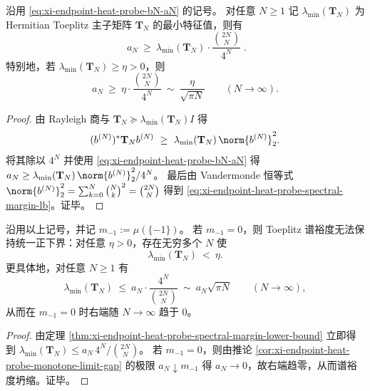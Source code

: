 \begin{theorem}[谱裕度对端点热核的显式下界]\label{thm:xi-endpoint-heat-probe-spectral-margin-lower-bound}
沿用 \eqref{eq:xi-endpoint-heat-probe-bN-aN} 的记号。
对任意 \(N\ge 1\) 记 \(\lambda_{\min}(\mathbf{T}_N)\) 为 Hermitian Toeplitz 主子矩阵 \(\mathbf{T}_N\) 的最小特征值，则有
\begin{equation}\label{eq:xi-endpoint-heat-probe-spectral-margin-lb}
\boxed{\;
a_N\ \ge\ \lambda_{\min}(\mathbf{T}_N)\cdot \frac{\binom{2N}{N}}{4^N}\; }.
\end{equation}
特别地，若 \(\lambda_{\min}(\mathbf{T}_N)\ge \eta>0\)，则
\[
a_N\ \ge\ \eta\cdot \frac{\binom{2N}{N}}{4^N}
\ \sim\ \frac{\eta}{\sqrt{\pi N}}\qquad(N\to\infty).
\]
\end{theorem}
\begin{proof}
由 Rayleigh 商与 \(\mathbf{T}_N\succeq \lambda_{\min}(\mathbf{T}_N)I\) 得
\[
(b^{(N)})^\ast\mathbf{T}_N b^{(N)}\ \ge\ \lambda_{\min}(\mathbf{T}_N)\,\norm{b^{(N)}}_2^2.
\]
将其除以 \(4^N\) 并使用 \eqref{eq:xi-endpoint-heat-probe-bN-aN} 得
\(
a_N\ge \lambda_{\min}(\mathbf{T}_N)\,\norm{b^{(N)}}_2^2/4^N
\)。
最后由 Vandermonde 恒等式
\(
\norm{b^{(N)}}_2^2=\sum_{k=0}^N\binom{N}{k}^2=\binom{2N}{N}
\)
得到 \eqref{eq:xi-endpoint-heat-probe-spectral-margin-lb}。证毕。
\end{proof}

\begin{corollary}[无端点原子时谱裕度必然坍缩]\label{cor:xi-endpoint-heat-probe-spectral-margin-collapse-no-atom}
沿用以上记号，并记 \(m_{-1}:=\mu(\{-1\})\)。
若 \(m_{-1}=0\)，则 Toeplitz 谱裕度无法保持统一正下界：对任意 \(\eta>0\)，存在无穷多个 \(N\) 使
\[
\lambda_{\min}(\mathbf{T}_N)\ <\ \eta.
\]
更具体地，对任意 \(N\ge 1\) 有
\[
\lambda_{\min}(\mathbf{T}_N)\ \le\ a_N\cdot \frac{4^N}{\binom{2N}{N}}
\ \sim\ a_N\sqrt{\pi N}\qquad(N\to\infty),
\]
从而在 \(m_{-1}=0\) 时右端随 \(N\to\infty\) 趋于 \(0\)。
\end{corollary}
\begin{proof}
由定理 \ref{thm:xi-endpoint-heat-probe-spectral-margin-lower-bound} 立即得到
\(
\lambda_{\min}(\mathbf{T}_N)\le a_N\,4^N/\binom{2N}{N}
\)。
若 \(m_{-1}=0\)，则由推论 \ref{cor:xi-endpoint-heat-probe-monotone-limit-gap} 的极限 \(a_N\downarrow m_{-1}\) 得 \(a_N\to 0\)，故右端趋零，从而谱裕度坍缩。证毕。
\end{proof}

